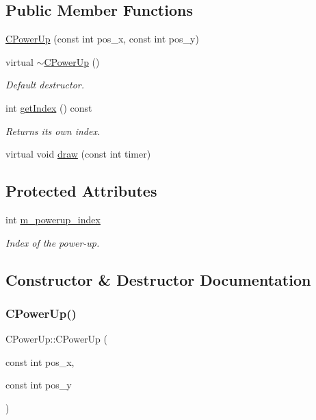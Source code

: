 \subsection*{Public Member Functions}
\begin{DoxyCompactItemize}
\item 
\hyperlink{classCPowerUp_ab7f897c487e77f7bbe41af2d0e15ddd4}{C\+Power\+Up} (const int pos\+\_\+x, const int pos\+\_\+y)
\item 
virtual \hyperlink{classCPowerUp_a7c76b245e1c5969add6f8721587817a3}{$\sim$\+C\+Power\+Up} ()
\begin{DoxyCompactList}\small\item\em Default destructor. \end{DoxyCompactList}\item 
int \hyperlink{classCPowerUp_ac934e9e2bebc680caf63c125f75178a8}{get\+Index} () const
\begin{DoxyCompactList}\small\item\em Returns it\textquotesingle{}s own index. \end{DoxyCompactList}\item 
virtual void \hyperlink{classCPowerUp_af1e0bad769efcde21858144596212e01}{draw} (const int timer)
\end{DoxyCompactItemize}
\subsection*{Protected Attributes}
\begin{DoxyCompactItemize}
\item 
int \hyperlink{classCPowerUp_aa8b01cf91f7b24d6d555ae32071bb3bc}{m\+\_\+powerup\+\_\+index}
\begin{DoxyCompactList}\small\item\em Index of the power-\/up. \end{DoxyCompactList}\end{DoxyCompactItemize}


\subsection{Constructor \& Destructor Documentation}
\mbox{\label{classCPowerUp_ab7f897c487e77f7bbe41af2d0e15ddd4}} 
\subsubsection{\texorpdfstring{C\+Power\+Up()}{CPowerUp()}}
{\footnotesize\ttfamily C\+Power\+Up\+::\+C\+Power\+Up (\begin{DoxyParamCaption}\item[{const int}]{pos\+\_\+x,  }\item[{const int}]{pos\+\_\+y }\end{DoxyParamCaption})}


